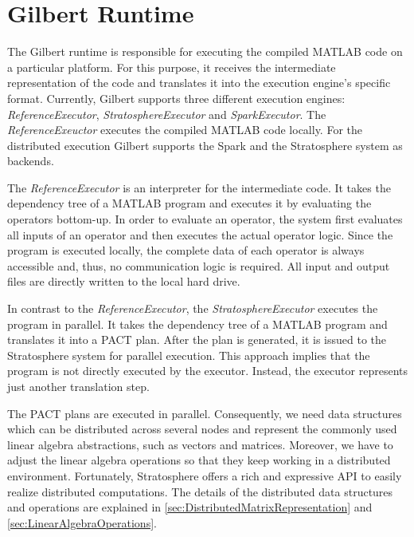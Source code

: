 \chapter{Gilbert Runtime}
\label{cha:gilbertruntime}


The Gilbert runtime is responsible for executing the compiled MATLAB code on a particular platform.
For this purpose, it receives the intermediate representation of the code and translates it into the execution engine's specific format.
Currently, Gilbert supports three different execution engines: \emph{ReferenceExecutor}, \emph{StratosphereExecutor} and \emph{SparkExecutor}.
The \emph{ReferenceExeuctor} executes the compiled MATLAB code locally.
For the distributed execution Gilbert supports the Spark and the Stratosphere system as backends.

The \emph{ReferenceExecutor} is an interpreter for the intermediate code.
It takes the dependency tree of a MATLAB program and executes it by evaluating the operators bottom-up.
In order to evaluate an operator, the system first evaluates all inputs of an operator and then executes the actual operator logic.
Since the program is executed locally, the complete data of each operator is always accessible and, thus, no communication logic is required.
All input and output files are directly written to the local hard drive.

In contrast to the \emph{ReferenceExecutor}, the \emph{StratosphereExecutor} executes the program in parallel.
It takes the dependency tree of a MATLAB program and translates it into a PACT plan.
After the plan is generated, it is issued to the Stratosphere system for parallel execution.
This approach implies that the program is not directly executed by the executor.
Instead, the executor represents just another translation step.

The PACT plans are executed in parallel.
Consequently, we need data structures which can be distributed across several nodes and represent the commonly used linear algebra abstractions, such as vectors and matrices.
Moreover, we have to adjust the linear algebra operations so that they keep working in a distributed environment.
Fortunately, Stratosphere offers a rich and expressive API to easily realize distributed computations.
The details of the distributed data structures and operations are explained in \cref{sec:DistributedMatrixRepresentation} and \cref{sec:LinearAlgebraOperations}.

